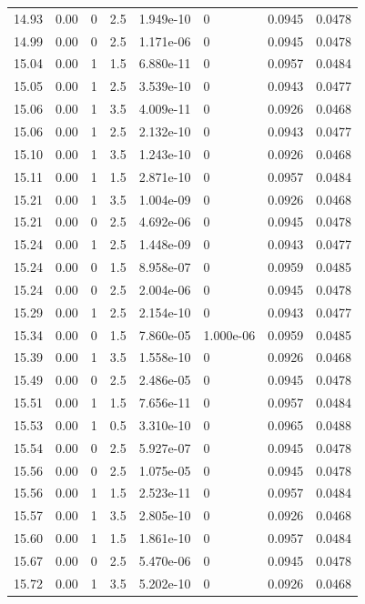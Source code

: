 \documentclass[preview]{standalone}
\begin{document}
{{{{{{{\begin{tabular}{L{1.2cm}C{1.2cm} C{0.3cm}C{0.5cm} C{1.4cm}C{1.4cm} C{1.4cm}C{1.4cm}}
  14.93  &  0.00  & 0     & 2.5 &  1.949e-10  & 0  & 0.0945 &  0.0478   \\ 
  14.99  &  0.00  & 0     & 2.5 &  1.171e-06  & 0  & 0.0945 &  0.0478   \\ 
  15.04  &  0.00  & 1     & 1.5 &  6.880e-11  & 0  & 0.0957 &  0.0484   \\ 
  15.05  &  0.00  & 1     & 2.5 &  3.539e-10  & 0  & 0.0943 &  0.0477   \\ 
  15.06  &  0.00  & 1     & 3.5 &  4.009e-11  & 0  & 0.0926 &  0.0468   \\ 
  15.06  &  0.00  & 1     & 2.5 &  2.132e-10  & 0  & 0.0943 &  0.0477   \\ 
  15.10  &  0.00  & 1     & 3.5 &  1.243e-10  & 0  & 0.0926 &  0.0468   \\ 
  15.11  &  0.00  & 1     & 1.5 &  2.871e-10  & 0  & 0.0957 &  0.0484   \\ 
  15.21  &  0.00  & 1     & 3.5 &  1.004e-09  & 0  & 0.0926 &  0.0468   \\ 
  15.21  &  0.00  & 0     & 2.5 &  4.692e-06  & 0  & 0.0945 &  0.0478   \\ 
  15.24  &  0.00  & 1     & 2.5 &  1.448e-09  & 0  & 0.0943 &  0.0477   \\ 
  15.24  &  0.00  & 0     & 1.5 &  8.958e-07  & 0  & 0.0959 &  0.0485   \\ 
  15.24  &  0.00  & 0     & 2.5 &  2.004e-06  & 0  & 0.0945 &  0.0478   \\ 
  15.29  &  0.00  & 1     & 2.5 &  2.154e-10  & 0  & 0.0943 &  0.0477   \\ 
  15.34  &  0.00  & 0     & 1.5 &  7.860e-05  & 1.000e-06  & 0.0959 &  0.0485   \\ 
  15.39  &  0.00  & 1     & 3.5 &  1.558e-10  & 0  & 0.0926 &  0.0468   \\ 
  15.49  &  0.00  & 0     & 2.5 &  2.486e-05  & 0  & 0.0945 &  0.0478   \\ 
  15.51  &  0.00  & 1     & 1.5 &  7.656e-11  & 0  & 0.0957 &  0.0484   \\ 
  15.53  &  0.00  & 1     & 0.5 &  3.310e-10  & 0  & 0.0965 &  0.0488   \\ 
  15.54  &  0.00  & 0     & 2.5 &  5.927e-07  & 0  & 0.0945 &  0.0478   \\ 
  15.56  &  0.00  & 0     & 2.5 &  1.075e-05  & 0  & 0.0945 &  0.0478   \\ 
  15.56  &  0.00  & 1     & 1.5 &  2.523e-11  & 0  & 0.0957 &  0.0484   \\ 
  15.57  &  0.00  & 1     & 3.5 &  2.805e-10  & 0  & 0.0926 &  0.0468   \\ 
  15.60  &  0.00  & 1     & 1.5 &  1.861e-10  & 0  & 0.0957 &  0.0484   \\ 
  15.67  &  0.00  & 0     & 2.5 &  5.470e-06  & 0  & 0.0945 &  0.0478   \\ 
  15.72  &  0.00  & 1     & 3.5 &  5.202e-10  & 0  & 0.0926 &  0.0468   \\ 
\hline 
\end{tabular} 

}}}}}}}
\end{document}

